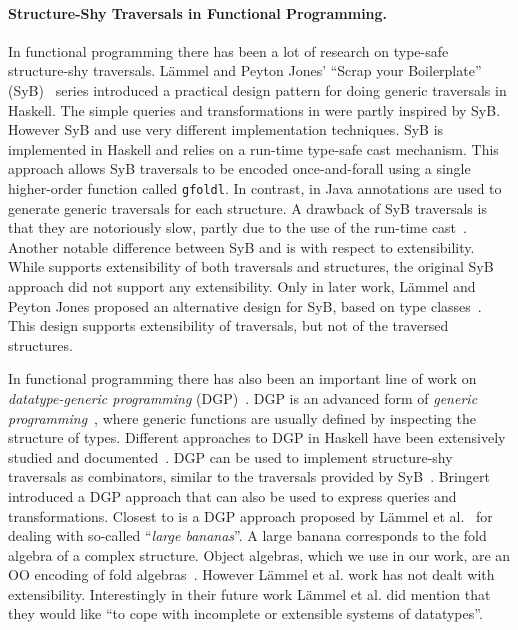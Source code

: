 
\paragraph{Structure-Shy Traversals in Functional Programming.}

In
functional programming there has been a lot of research on type-safe
structure-shy traversals. L\"ammel and Peyton Jones' ``Scrap your
Boilerplate'' (SyB)~\cite{ralf03syb,lammel04syb,lammel05syb} series
introduced a practical design pattern for doing generic
traversals in Haskell. The simple queries and transformations in
\name were partly inspired by SyB. However SyB and \name use very
different implementation techniques. SyB is implemented in Haskell and
relies on a run-time type-safe cast mechanism. This approach allows
SyB traversals to be encoded once-and-forall using a single
higher-order function called \lstinline{gfoldl}. In contrast, in \name
Java annotations are used to generate generic traversals for each
structure. A drawback of SyB traversals is that they are notoriously
slow, partly due to the use of the run-time
cast~\cite{adams2012tyb}. Another notable difference between SyB and
\name is with respect to extensibility. While \name supports
extensibility of both traversals and structures, the original SyB
approach did not support any extensibility. Only in later work,
L\"ammel and Peyton Jones proposed an alternative design for SyB,
based on type classes~\cite{wadler89type-classes}.
This design supports extensibility of traversals, but not of the
traversed structures.

In functional programming there has also been an important line of
work on \emph{datatype-generic programming} (DGP)~\cite{Gibbons07dgp}.  DGP is an
advanced form of \emph{generic programming}~\cite{GP}, where generic
functions are usually defined by inspecting the structure of
types.  Different approaches to DGP in Haskell have been extensively studied and documented~\cite{ComparingGPHaskellRodriquez,ComparingGPHaskellHinze}.
DGP can be used to implement structure-shy traversals as combinators,
similar to the traversals provided by SyB~\cite{hinze2003fun}.
Bringert~\cite{bjorn08acf}
introduced a DGP approach that can also be used to express queries
and transformations. Closest to \name is a DGP approach proposed by
L\"ammel et al.~\cite{lammel00dealing} for dealing with so-called
``\emph{large bananas}''. A large banana corresponds to the fold
algebra of a complex structure. Object algebras, which we use in our
work, are an OO encoding of fold algebras~\cite{Oliveira08visitor,bruno12oa}.
However L\"ammel et al. work has not dealt with extensibility. Interestingly
in their future work  L\"ammel et al. did mention that they would like ``to cope
with incomplete or extensible systems of datatypes''.

